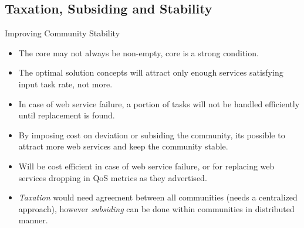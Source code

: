 \documentclass{beamer}
\begin{document}
\subsection{Taxation, Subsiding and Stability}
\begin{frame}{Improving Community Stability}
    \begin{itemize}
        \item The core may not always be non-empty, core is a strong condition.
        \item The optimal solution concepts will attract only enough services satisfying input task rate, not more.
        \item In case of web service failure, a portion of tasks will not be handled efficiently until replacement is found.
        \item By imposing cost on deviation or subsiding the community, its possible to attract more web services and keep the community stable.
        \item Will be cost efficient in case of web service failure, or for replacing web services dropping in QoS metrics as they advertised.
        \item \emph{Taxation} would need agreement between all communities (needs a centralized approach), however \emph{subsiding} can be done within communities in distributed manner.
    \end{itemize}
\end{frame}
\end{document}
